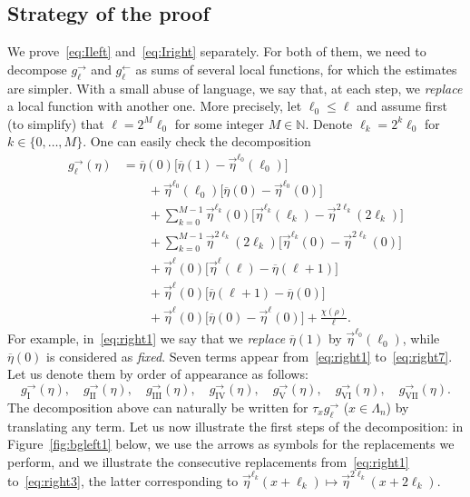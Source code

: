 \documentclass[AHL,Unicode,longabstracts]{cedram}
\newcommand*{\rmI}{\mathrm{I}}
\newcommand*{\rmII}{\mathrm{II}}
\newcommand*{\rmIII}{\mathrm{III}}
\newcommand*{\rmIV}{\mathrm{IV}}
\newcommand*{\rmV}{\mathrm{V}}
\newcommand*{\rmVI}{\mathrm{VI}}
\newcommand*{\rmVII}{\mathrm{VII}}
\newcommand{\bb}[1]{{\mathbb #1}}
\renewcommand\vec[1]{\overrightarrow{#1}}
\renewcommand{\bar}{\overline}
\renewcommand{\leq}{\leqslant}
\begin{document}
\subsection{Strategy of the proof}
\label{ssec:strategy}

We prove~\eqref{eq:Ileft} and~\eqref{eq:Iright} separately. For both of them, we need to decompose $g^\rightarrow_\ell$ and $g^\leftarrow_\ell$ as sums of several local functions, for which the estimates are simpler. With a small abuse of language, we say that, at each step, we \emph{replace} a local function with another one. More precisely, let $\ell_0 \leq \ell$ and assume first (to simplify) that $\ell= 2^M\ell_0$ for some integer $M\in\bb N$. Denote $\ell_k=2^k\ell_0$ for $k\in\{0,\dots,M\}$. One can easily check the decomposition
\begingroup
\begin{align}
g^\rightarrow_\ell(\eta) &= \bar\eta(0)\Big[\bar\eta(1)-\vec\eta^{\ell_0}(\ell_0)\Big] \label{eq:right1}
\\
&\qquad + \vec\eta^{\ell_0}(\ell_0) \Big[\bar\eta(0)-\vec\eta^{\ell_0}(0)\Big] \label{eq:right2}
\\
&\qquad + \sum_{k=0}^{M-1} \vec\eta^{\ell_k}(0) \Big[\vec\eta^{\ell_k}(\ell_k)-\vec\eta^{2\ell_k}(2\ell_k)\Big] \label{eq:right3}
\\
&\qquad + \sum_{k=0}^{M-1} \vec\eta^{2\ell_k}(2\ell_k) \Big[\vec\eta^{\ell_k}(0)-\vec\eta^{2\ell_k}(0)\Big]\label{eq:right4}
\\
&\qquad + \vec\eta^\ell(0) \Big[\vec\eta^\ell(\ell)-\bar\eta(\ell+1)\Big]\label{eq:right5}
\\
&\qquad + \vec\eta^\ell(0) \Big[\bar\eta(\ell+1)-\bar\eta(0)\Big]\label{eq:right6}
\\
&\qquad + \vec\eta^\ell(0) \Big[\bar\eta(0)-\vec\eta^\ell(0)\Big] + \frac{\chi(\rho)}{\ell}. \label{eq:right7}
\end{align}
\endgroup
For example, in~\eqref{eq:right1} we say that we \emph{replace} $\bar\eta(1)$ by $\vec\eta^{\ell_0}(\ell_0)$, while $\bar\eta(0)$ is considered as \emph{fixed}. Seven terms appear from~\eqref{eq:right1} to~\eqref{eq:right7}. Let us denote them by order of appearance as follows:
\[
g^\rightarrow_{\rmI}(\eta), \quad g^\rightarrow_{\rmII}(\eta),\quad g^\rightarrow_{\rmIII}(\eta),\quad g^\rightarrow_{\rmIV}(\eta), \quad g^\rightarrow_{\rmV}(\eta),\quad g^\rightarrow_{\rmVI}(\eta),\quad g^\rightarrow_{\rmVII}(\eta).
\]
The decomposition above can naturally be written for $\tau_x g^\rightarrow_\ell$ ($x\in\Lambda_n$) by translating any term. Let us now illustrate the first steps of the decomposition: in Figure~\ref{fig:bgleft1} below, we use the arrows as symbols for the replacements we perform, and we illustrate the consecutive replacements from~\eqref{eq:right1} to~\eqref{eq:right3}, the latter corresponding to $\vec\eta^{\ell_k}(x+\ell_k) \mapsto \vec\eta^{2\ell_k}(x+2\ell_k).$
\end{document}
